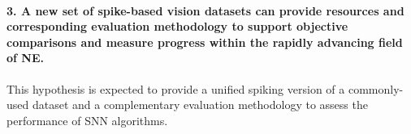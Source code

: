\paragraph{3. A new set of spike-based vision datasets can provide resources and corresponding evaluation methodology to support objective comparisons and measure progress within the rapidly advancing field of NE.}
This hypothesis is expected to provide a unified spiking version of a commonly-used dataset and a complementary evaluation methodology to assess the performance of SNN algorithms.

%
%
%
